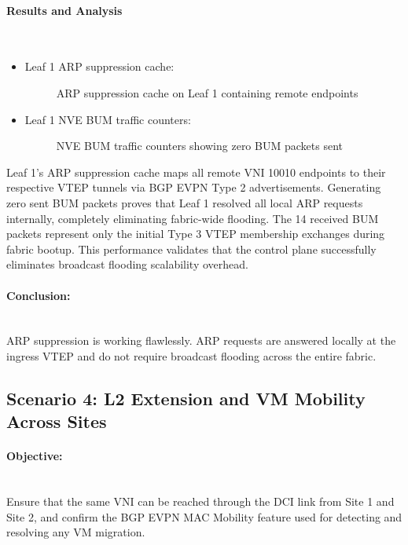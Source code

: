 \paragraph{Results and Analysis}~\\
\begin{itemize}
    \item []Leaf 1 ARP suppression cache:
    \begin{figure}[!htbp]
        \centering
        \ARPsuppression
        \caption{ARP suppression cache on Leaf 1 containing remote endpoints}
        \label{fig:arp-suppression-cache}
    \end{figure}
    \newpage
    \item []Leaf 1 NVE BUM traffic counters:
    \begin{figure}[!htbp]
        \centering
        \BUMEVPNTRAFFIC
        \caption{NVE BUM traffic counters showing zero BUM packets sent}
        \label{fig:bum-counters}
    \end{figure}
\end{itemize}
Leaf 1's ARP suppression cache maps all remote VNI 10010 endpoints to their respective VTEP tunnels via BGP EVPN Type 2 advertisements. Generating zero sent BUM packets proves that Leaf 1 resolved all local ARP requests internally, completely eliminating fabric-wide flooding. The 14 received BUM packets represent only the initial Type 3 VTEP membership exchanges during fabric bootup. This performance validates that the control plane successfully eliminates broadcast flooding scalability overhead.
\paragraph{Conclusion:}~\\
ARP suppression is working flawlessly. ARP requests are answered locally at the ingress VTEP and do not require broadcast flooding across the entire fabric.

\subsection{Scenario 4: L2 Extension and VM Mobility Across Sites}
\paragraph{Objective:}~\\
Ensure that the same VNI can be reached through the DCI link from Site 1 and Site 2, and confirm the BGP EVPN MAC Mobility feature used for detecting and resolving any VM migration.

